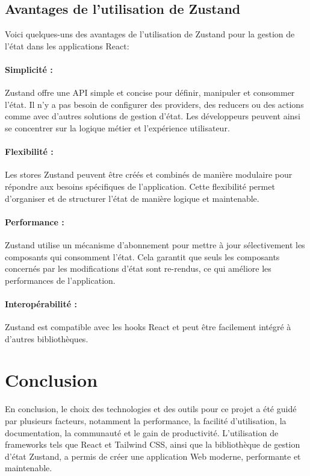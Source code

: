 \subsection{Avantages de l'utilisation de Zustand}

Voici quelques-uns des avantages de l'utilisation de Zustand pour la gestion de l'état dans les applications React:

\paragraph{Simplicité :} Zustand offre une API simple et concise pour définir, manipuler et consommer l'état. Il n'y a pas besoin de configurer des providers, des reducers ou des actions comme avec d'autres solutions de gestion d'état. Les développeurs peuvent ainsi se concentrer sur la logique métier et l'expérience utilisateur.

\paragraph{Flexibilité :} Les stores Zustand peuvent être créés et combinés de manière modulaire pour répondre aux besoins spécifiques de l'application. Cette flexibilité permet d'organiser et de structurer l'état de manière logique et maintenable.

\paragraph{Performance :} Zustand utilise un mécanisme d'abonnement pour mettre à jour sélectivement les composants qui consomment l'état. Cela garantit que seuls les composants concernés par les modifications d'état sont re-rendus, ce qui améliore les performances de l'application.

\paragraph{Interopérabilité :} Zustand est compatible avec les hooks React et peut être facilement intégré à d'autres bibliothèques.

\section{Conclusion}
En conclusion, le choix des technologies et des outils pour ce projet a été guidé par plusieurs facteurs, notamment la performance, la facilité d'utilisation, la documentation, la communauté et le gain de productivité. L'utilisation de frameworks tels que React et Tailwind CSS, ainsi que la bibliothèque de gestion d'état Zustand, a permis de créer une application Web moderne, performante et maintenable.

